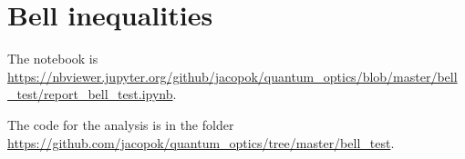 \documentclass[main.tex]{subfiles}
\begin{document}
\section{Bell inequalities}

The notebook is \url{https://nbviewer.jupyter.org/github/jacopok/quantum_optics/blob/master/bell_test/report_bell_test.ipynb}.

The code for the analysis is in the folder \url{https://github.com/jacopok/quantum_optics/tree/master/bell_test}. 
\end{document}
